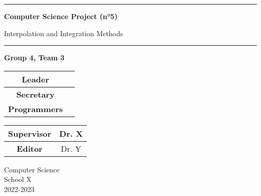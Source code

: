 \documentclass{article}
\def\groupe{4}
\def\equipe{3}
\begin{document}
\begin{titlepage}
	\begin{center}
		\vspace*{1cm}
		\begin{figure}[htbp]
		\end{figure}

		\vspace*{1.5cm}
		\rule{\linewidth}{1mm}\newline
		
		\textbf{\huge{Computer Science Project (n°5)}}
 
		\vspace{0.4cm}
		\LARGE{Interpolation and Integration Methods}
		\rule{\linewidth}{1mm}
		\vspace{0.1cm}

		\Large
		\textbf{Group \groupe, Team \equipe}\\
		\vspace{0.5cm}
		\Large
		\begin{center}
			\begin{tabular}{|c|c|}
				\hline
				\textbf{Leader} \\
				\hline
				\textbf{Secretary}  \\
				\hline
				\textbf{Programmers} \\
				\hline
			\end{tabular}
		\end{center}
		
		\begin{center}
			\begin{tabular}{|c|c|}
				\hline
				\textbf{Supervisor} & Dr. X \\
				\hline
				\textbf{Editor} & Dr. Y \\
				\hline
			\end{tabular}
		\end{center}
		\vspace{0.7cm}
 
		\vfill
		Computer Science\\
		School X\\
		2022-2023 
	\end{center}
\end{titlepage}



\tableofcontents



\label{sec1}

\label{sec2}

\label{sec3}
\end{document}
